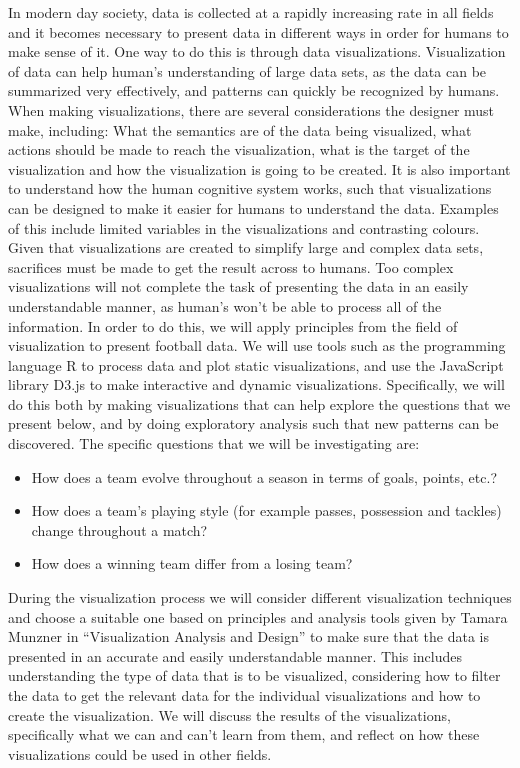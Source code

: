 \documentclass[Report.tex]{subfiles}
\begin{document}
In modern day society, data is collected at a rapidly increasing rate in all fields and it becomes necessary to present data in different ways in order for humans to make sense of it. One way to do this is through data visualizations. Visualization of data can help human’s understanding of large data sets, as the data can be summarized very effectively, and patterns can quickly be recognized by humans. When making visualizations, there are several considerations the designer must make, including: What the semantics are of the data being visualized, what actions should be made to reach the visualization, what is the target of the visualization and how the visualization is going to be created. It is also important to understand how the human cognitive system works, such that visualizations can be designed to make it easier for humans to understand the data. Examples of this include limited variables in the visualizations and contrasting colours. Given that visualizations are created to simplify large and complex data sets, sacrifices must be made to get the result across to humans. Too complex visualizations will not complete the task of presenting the data in an easily understandable manner, as human’s won’t be able to process all of the information. 
In order to do this, we will apply principles from the field of visualization to present football data. We will use tools such as the programming language R to process data and plot static visualizations, and use the JavaScript library D3.js to make interactive and dynamic visualizations. 
Specifically, we will do this both by making visualizations that can help explore the questions that we present below, and by doing exploratory analysis such that new patterns can be discovered. The specific questions that we will be investigating are: 
\begin{itemize}
\item How does a team evolve throughout a season in terms of goals, points,
etc.?
\item How does a team’s playing style (for example passes, possession and tackles)
change throughout a match?
\item How does a winning team differ from a losing team?
\end{itemize}
During the visualization process we will consider different visualization techniques and choose a suitable one based on principles and analysis tools given by Tamara Munzner in “Visualization Analysis and Design” to make sure that the data is presented in an accurate and easily understandable manner. This includes understanding the type of data that is to be visualized, considering how to filter the data to get the relevant data for the individual visualizations and how to create the visualization. We will discuss the results of the visualizations, specifically what we can and can’t learn from them, and reflect on how these visualizations could be used in other fields.
\end{document}
